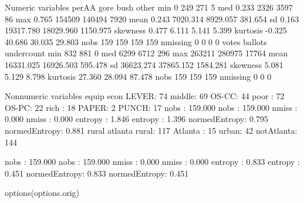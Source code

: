 \begin{Schunk}
\begin{Soutput}
Numeric variables
             perAA         gore         bush        other   
min             0          249          271            5    
med             0.233     2326         3597           86    
max             0.765   154509       140494         7920    
mean            0.243     7020.314     8929.057      381.654
sd              0.163    19317.780    18029.960     1150.975
skewness        0.477        6.111        5.141        5.399
kurtosis       -0.325       40.686       30.035       29.803
nobs          159          159          159          159    
nmissing        0            0            0            0    
             votes        ballots    undercount
min           832          881            0    
med          6299         6712          296    
max        263211       280975        17764    
mean        16331.025    16926.503      595.478
sd          36623.274    37865.152     1584.281
skewness        5.081        5.129        8.798
kurtosis       27.360       28.094       87.478
nobs          159          159          159    
nmissing        0            0            0    

Nonnumeric variables
                equip                   econ  
 LEVER: 74              middle: 69            
 OS-CC: 44              poor  : 72            
 OS-PC: 22              rich  : 18            
 PAPER: 2                                     
 PUNCH: 17                                    
 nobs         : 159.000 nobs         : 159.000
 nmiss        :   0.000 nmiss        :   0.000
 entropy      :   1.846 entropy      :   1.396
 normedEntropy:   0.795 normedEntropy:   0.881
                rural                 atlanta 
 rural: 117             Atlanta   : 15        
 urban: 42              notAtlanta: 144       
                                              
                                              
                                              
 nobs         : 159.000 nobs         : 159.000
 nmiss        :   0.000 nmiss        :   0.000
 entropy      :   0.833 entropy      :   0.451
 normedEntropy:   0.833 normedEntropy:   0.451
\end{Soutput}
\begin{Sinput}
 options(options.orig)
\end{Sinput}
\end{Schunk}
